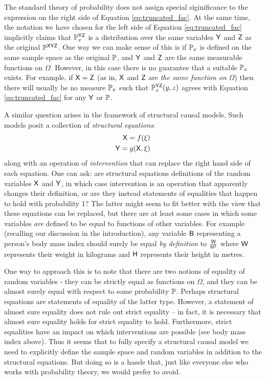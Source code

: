 The standard theory of probability does not assign special siginificance to the expression on the right side of Equation \ref{eq:truncated_fac}. At the same time, the notation we have chosen for the left side of Equation \ref{eq:truncated_fac} implicitly claims that $\mathbb{P}^{\mathsf{YZ}}_{x}$ is a distribution over the same variables $\mathsf{Y}$ and $\mathsf{Z}$ as the original $\mathbb{P}^{\mathsf{XYZ}}$. One way we can make sense of this is if $\mathbb{P}_{x}$ is defined on the same sample space as the original $\mathbb{P}$, and $\mathsf{Y}$ and $\mathsf{Z}$ are the same measurable functions on $\Omega$. However, in this case there is no guarantee that a suitable $\mathbb{P}_x$ exists. For example, if $\mathsf{X}=\mathsf{Z}$ (as in, $\mathsf{X}$ and $\mathsf{Z}$ are \emph{the same function on }$\Omega$) then there will usually be no measure $\mathbb{P}_x$ such that $\mathbb{P}^{\mathsf{YZ}}_{x}(y,z)$ agrees with Equation \ref{eq:truncated_fac} for any $\mathsf{Y}$ or $\mathbb{P}$.

A similar question arises in the framework of structural causal models. Such models posit a collection of \emph{structural equations}:
\begin{align}
	\mathsf{X}=f(\xi)\\
	\mathsf{Y}=g(\mathsf{X},\xi)
\end{align}
along with an operation of \emph{intervention} that can replace the right hand side of each equation. One can ask: are structural equations definitions of the random variables $\mathsf{X}$ and $\mathsf{Y}$, in which case intervention is an operation that apparently changes their definition, or are they instead statements of equalities that happen to hold with probability 1? The latter might seem to fit better with the view that these equations can be replaced, but there are at least some cases in which some variables \emph{are} defined to be equal to functions of other variables. For example (recalling our discussion in the introduction), any variable $\mathsf{B}$ representing a person's body mass index should surely be equal \emph{by definition} to $\frac{\mathsf{W}}{\mathsf{H}^2}$ where $\mathsf{W}$ represents their weight in kilograms and $\mathsf{H}$ represents their height in metres. 

One way to approach this is to note that there are two notions of equality of random variables - they can be strictly equal as functions on $\Omega$, and they can be almost surely equal with respect to some probability $\mathbb{P}$. Perhaps structural equations are statements of equality of the latter type. However, a statement of almost sure equality does not rule out strict equality -- in fact, it is necessary that almost sure equality holds for strict equality to hold. Furthermore, strict equalities have an impact on which interventions are possible (see body mass index above). Thus it seems that to fully specify a structural causal model we need to explicitly define the sample space and random variables in addition to the structural equations. But doing so is a hassle that, just like everyone else who works with probability theory, we would prefer to avoid.

